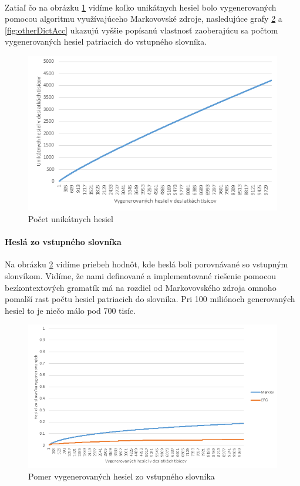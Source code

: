 \paragraph{}
Zatiaľ čo na obrázku \ref{fig:uniqMarkov} vidíme koľko unikátnych hesiel bolo vygenerovaných pomocou algoritmu využívajúceho Markovovské zdroje, nasledujúce grafy \ref{fig:sameDictAcc} a \ref{fig:otherDictAcc} ukazujú vyššie popísanú vlastnosť zaoberajúcu sa počtom vygenerovaných hesiel patriacich do vstupného slovníka.

\begin{figure}[ht]
    \centering
    \includegraphics[width=1\textwidth]{uniqMarkov}
    \caption{Počet unikátnych hesiel}
    \label{fig:uniqMarkov}
\end{figure}
\paragraph{Heslá zo vstupného slovníka}
Na obrázku \ref{fig:sameDictAcc} vidíme priebeh hodnôt, kde heslá boli porovnávané so vstupným slonvíkom. Vidíme, že nami definované a implementované riešenie pomocou bezkontextových gramatík má na rozdiel od Markovovského zdroja omnoho pomalší rast počtu hesiel patriacich do slovníka. Pri 100 miliónoch generovaných hesiel to je niečo málo pod 700 tisíc.

\begin{figure}[ht]
    \centering
    \includegraphics[width=1\textwidth]{sameDictAcc}
    \caption{Pomer vygenerovaných hesiel zo vstupného slovníka}
    \label{fig:sameDictAcc}
\end{figure}

